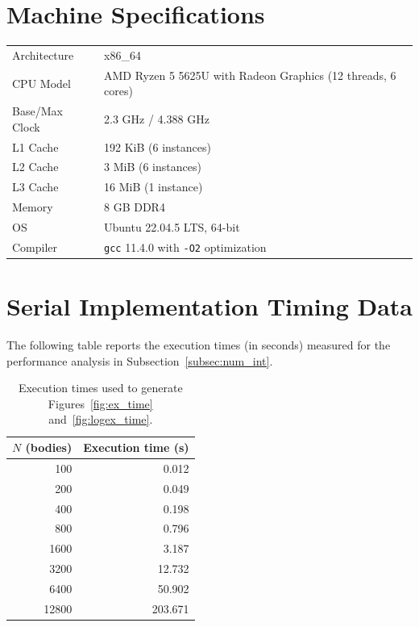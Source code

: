 \documentclass{article}
\begin{document}
\section[Machine Specifications]{Machine Specifications}
\label{appendix:machine_specs}
\begin{tabular}{ll}
\toprule
Architecture & x86\_64 \\
CPU Model & AMD Ryzen 5 5625U with Radeon Graphics (12 threads, 6 cores) \\
Base/Max Clock & 2.3 GHz / 4.388 GHz \\
L1 Cache & 192 KiB (6 instances) \\
L2 Cache & 3 MiB (6 instances) \\
L3 Cache & 16 MiB (1 instance) \\
Memory & 8 GB DDR4 \\
OS & Ubuntu 22.04.5 LTS, 64-bit \\
Compiler & \texttt{gcc} 11.4.0 with \texttt{-O2} optimization \\
\bottomrule
\end{tabular}

\section{Serial Implementation Timing Data}
\label{appendix:serial_times}
The following table reports the execution times (in seconds) measured for the performance analysis in Subsection~\ref{subsec:num_int}.

\begin{table}[H]
    \centering
    \begin{tabular}{r r}
        \toprule
        \textbf{$N$ (bodies)} & \textbf{Execution time (s)} \\
        \midrule
        100 & 0.012 \\
        200 & 0.049 \\
        400 & 0.198 \\
        800 & 0.796 \\
        1600 & 3.187 \\
        3200 & 12.732 \\
        6400 & 50.902 \\
        12800 & 203.671 \\
        \bottomrule
    \end{tabular}
    \caption{Execution times used to generate Figures~\ref{fig:ex_time} and~\ref{fig:logex_time}.}
    \label{tab:serial_times}
\end{table}
\end{document}
